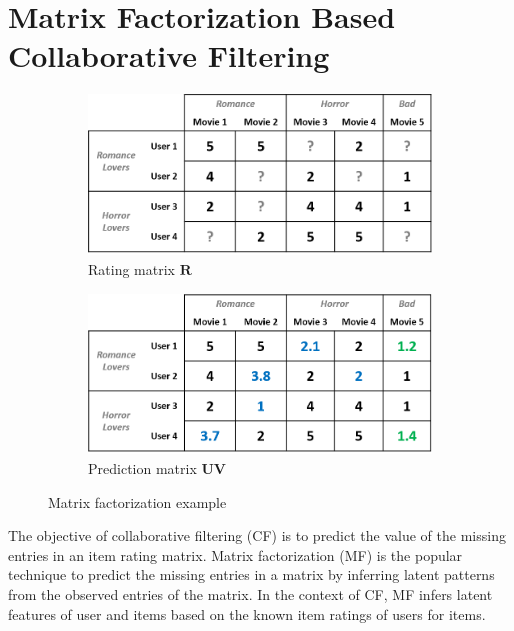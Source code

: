 \documentclass[master,english,final]{kaist-ucs}
\begin{document}
\section{Matrix Factorization Based Collaborative Filtering}
\begin{figure}[b]
    \centering
    \begin{subfigure}[b]{0.45\textwidth}
        \centering
        \includegraphics[width=\textwidth]{figure/mf_before_rating}
        \caption{Rating matrix $\bm{R}$}
        \label{mf_before_rating}
    \end{subfigure}
    \begin{subfigure}[b]{0.45\textwidth}
        \centering
        \includegraphics[width=\textwidth]{figure/mf_before_prediction}
        \caption{Prediction matrix $\bm{UV}$}
        \label{mf_before_prediction}
    \end{subfigure}
    \caption{Matrix factorization example}
    \label{mf_base}
\end{figure}
The objective of collaborative filtering (CF) is to predict the value of the missing entries in an item rating matrix.
Matrix factorization (MF) is the popular technique to predict the missing entries in a matrix by inferring latent patterns from the observed entries of the matrix.
In the context of CF, MF infers latent features of user and items based on the known item ratings of users for items.
\end{document}
